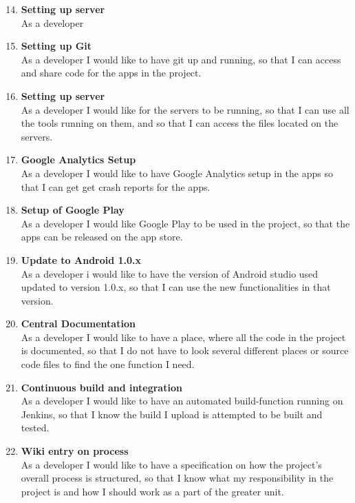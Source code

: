 \begin{enumerate}
	\setcounter{enumi}{13} %
	\item \textbf{Setting up server}\\
	As a developer
	
	\item \textbf{Setting up Git}\\
	As a developer I would like to have git up and running, so that I can access and share code for the apps in the project.
	
	\item \textbf{Setting up server}\\
	As a developer I would like for the servers to be running, so that I can use all the tools running on them, and so that I can access the files located on the servers.
	
	\item \textbf{Google Analytics Setup}\\
	As a developer I would like to have Google Analytics setup in the apps so that I can get get crash reports for the apps.
	
	\item \textbf{Setup of Google Play}\\
	As a developer I would like Google Play to be used in the project, so that the apps can be released on the app store.
	
	\item \textbf{Update to Android 1.0.x}\\
	As a developer i would like to have the version of Android studio used updated to version 1.0.x, so that I can use the new functionalities in that version.
	
	\item \textbf{Central Documentation}\\
	As a developer I would like to have a place, where all the code in the project is documented, so that I do not have to look several different places or source code files to find the one function I need.
	
	\item \textbf{Continuous build and integration}\\
	As a developer I would like to have an automated build-function running on Jenkins, so that I know the build I upload is attempted to be built and tested.
	
	\item \textbf{Wiki entry on process}\\
	As a developer I would like to have a specification on how the project’s overall process is structured, so that I know what my responsibility in the project is and how I should work as a part of the greater unit.
\end{enumerate}

